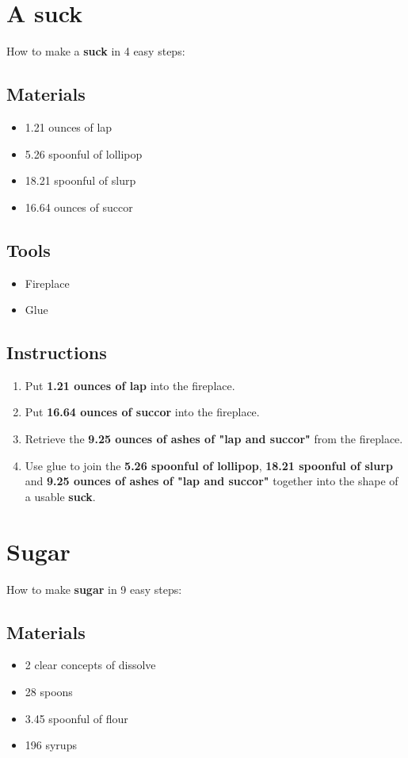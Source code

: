 \documentclass{article}
\begin{document}
\section{A suck}How to make a \textbf{suck} in 4 easy steps:

\subsection{Materials}\begin{itemize}
\item 
1.21 ounces of lap
\item 
5.26 spoonful of lollipop
\item 
18.21 spoonful of slurp
\item 
16.64 ounces of succor
\end{itemize}
\subsection{Tools}\begin{itemize}
\item 
Fireplace
\item 
Glue
\end{itemize}
\subsection{Instructions}\begin{enumerate}
\item 
Put \textbf{1.21 ounces of lap} into the fireplace.
\item 
Put \textbf{16.64 ounces of succor} into the fireplace.
\item 
Retrieve the \textbf{9.25 ounces of ashes of "lap and succor"} from the fireplace.
\item 
Use glue to join the \textbf{5.26 spoonful of lollipop}, \textbf{18.21 spoonful of slurp} and \textbf{9.25 ounces of ashes of "lap and succor"} together into the shape of a usable \textbf{suck}.
\end{enumerate}
\newpage
\section{Sugar}How to make \textbf{sugar} in 9 easy steps:

\subsection{Materials}\begin{itemize}
\item 
2 clear concepts of dissolve
\item 
28 spoons
\item 
3.45 spoonful of flour
\item 
196 syrups
\end{itemize}
\end{document}
